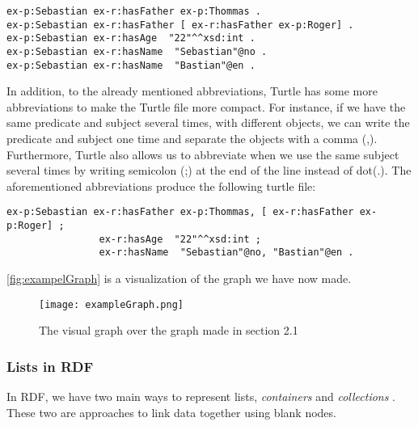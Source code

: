 \begin{lstlisting}[frame=single, language=turtle]
ex-p:Sebastian ex-r:hasFather ex-p:Thommas .
ex-p:Sebastian ex-r:hasFather [ ex-r:hasFather ex-p:Roger] . 
ex-p:Sebastian ex-r:hasAge  "22"^^xsd:int . 
ex-p:Sebastian ex-r:hasName  "Sebastian"@no . 
ex-p:Sebastian ex-r:hasName  "Bastian"@en .
\end{lstlisting}

\para
In addition, to the already mentioned abbreviations, Turtle has some more abbreviations to make the Turtle file more compact. For instance, if we have the same predicate and subject several times, with different objects, we can write the predicate and subject one time and separate the objects with a comma (,). Furthermore, Turtle also allows us to abbreviate when we use the same subject several times by writing semicolon (;) at the end of the line instead of dot(.). The aforementioned abbreviations produce the following turtle file:

\begin{lstlisting}[frame=single, language=turtle]
ex-p:Sebastian ex-r:hasFather ex-p:Thommas, [ ex-r:hasFather ex-p:Roger] ; 
                ex-r:hasAge  "22"^^xsd:int ; 
                ex-r:hasName  "Sebastian"@no, "Bastian"@en .
\end{lstlisting}
\autoref{fig:exampelGraph} is a visualization of the graph we have now made.

\begin{figure}
    \centering
    \texttt{[image: exampleGraph.png]}
    \caption{The visual graph over the graph made in section 2.1}
    \label{fig:exampelGraph}
\end{figure}

\subsubsection{Lists in RDF}
In RDF, we have two main ways to represent lists, \emph{containers} and \emph{collections} \autocite[58-63]{FOSWT}. These two are approaches to link data together using blank nodes.

